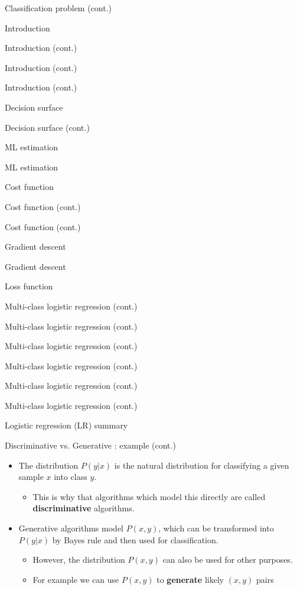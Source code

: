 \documentclass[serif, aspectratio=169]{beamer}
\begin{document}
\begin{frame}{Classification problem (cont.)}
\begin{itemize}
\begin{frame}{Introduction}
\begin{itemize}
\begin{frame}{Introduction (cont.)}
\begin{frame}{Introduction (cont.)}
\begin{frame}{Introduction (cont.)}
\begin{frame}{Decision surface}
\begin{itemize}
\begin{frame}{Decision surface (cont.)}
\begin{frame}{ML estimation}
\begin{frame}{ML estimation}
\begin{itemize}
\begin{frame}{Cost function}
\begin{frame}{Cost function (cont.)}
\begin{itemize}
\begin{itemize}
\begin{frame}{Cost function (cont.)}
\begin{frame}{Gradient descent}
\begin{frame}{Gradient descent}
\begin{frame}{Loss function}
\begin{frame}{Multi-class logistic regression (cont.)}
\begin{frame}{Multi-class logistic regression (cont.)}
\begin{frame}{Multi-class logistic regression (cont.)}
\begin{frame}{Multi-class logistic regression (cont.)}
\begin{frame}{Multi-class logistic regression (cont.)}
\begin{frame}{Multi-class logistic regression (cont.)}
\begin{frame}{Logistic regression (LR) summary}
\begin{itemize}
\begin{frame}{Discriminative vs. Generative : example (cont.)}
    \begin{itemize}
        \item The distribution $P(y|x)$ is the natural distribution for classifying a given sample $x$ into class $y$.
            \begin{itemize}
                \item This is why that algorithms which model this directly are called \textbf{discriminative} algorithms.
            \end{itemize}
        \item Generative algorithms model $P(x,y)$, which can be transformed into $P(y|x)$ by Bayes rule and then used for classification.
            \begin{itemize}
                \item However, the distribution $P(x,y)$ can also be used for other purposes.
                \item For example we can use $P(x,y)$ to \textbf{generate} likely $(x,y)$ pairs
            \end{itemize}
    \end{itemize}
\end{frame}


\end{itemize}
\end{frame}
\end{frame}
\end{frame}
\end{frame}
\end{frame}
\end{frame}
\end{frame}
\end{frame}
\end{frame}
\end{frame}
\end{frame}
\end{itemize}
\end{itemize}
\end{frame}
\end{frame}
\end{itemize}
\end{frame}
\end{frame}
\end{frame}
\end{itemize}
\end{frame}
\end{frame}
\end{frame}
\end{frame}
\end{itemize}
\end{frame}
\end{itemize}
\end{frame}
\end{document}
